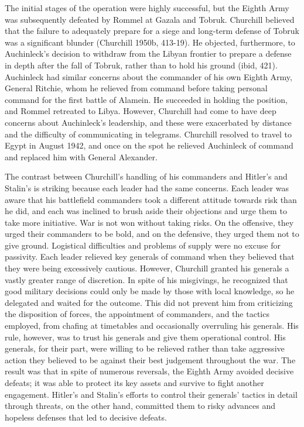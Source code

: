 \documentclass[11pt,]{article}
\begin{document}
The initial stages of the operation were highly successful, but the Eighth Army was subsequently defeated by Rommel at Gazala and Tobruk.  Churchill believed that the failure to adequately prepare for a siege and long-term defense of Tobruk was a significant blunder (Churchill 1950b, 413-19).  He objected, furthermore, to Auchinleck's decision to withdraw from the Libyan frontier to prepare a defense in depth after the fall of Tobruk, rather than to hold his ground (ibid, 421).  Auchinleck had similar concerns about the commander of his own Eighth Army, General Ritchie, whom he relieved from command before taking personal command for the first battle of Alamein.  He succeeded in holding the position, and Rommel retreated to Libya.  However, Churchill had come to have deep concerns about Auchinleck's leadership, and these were exacerbated by distance and the difficulty of communicating in telegrams.  Churchill resolved to travel to Egypt in August 1942, and once on the spot he relieved Auchinleck of command and replaced him with General Alexander.  

The contrast between Churchill's handling of his commanders and Hitler's and Stalin's is striking because each leader had the same concerns.  Each leader was aware that his battlefield commanders took a different attitude towards risk than he did, and each was inclined to brush aside their objections and urge them to take more initiative.  War is not won without taking risks.  On the offensive, they urged their commanders to be bold, and on the defensive, they urged them not to give ground.  Logistical difficulties and problems of supply were no excuse for passivity.  Each leader relieved key generals of command when they believed that they were being excessively cautious.  However, Churchill granted his generals a vastly greater range of discretion.  In spite of his misgivings, he recognized that good military decisions could only be made by those with local knowledge, so he delegated and waited for the outcome.  This did not prevent him from criticizing the disposition of forces, the appointment of commanders, and the tactics employed, from chafing at timetables and occasionally overruling his generals.  His rule, however, was to trust his generals and give them operational control.  His generals, for their part, were willing to be relieved rather than take aggressive action they believed to be against their best judgement throughout the war.  The result was that in spite of numerous reversals, the Eighth Army avoided decisive defeats; it was able to protect its key assets and survive to fight another engagement.  Hitler's and Stalin's efforts to control their generals' tactics in detail through threats, on the other hand, committed them to risky advances and hopeless defenses that led to decisive defeats.
\end{document}
